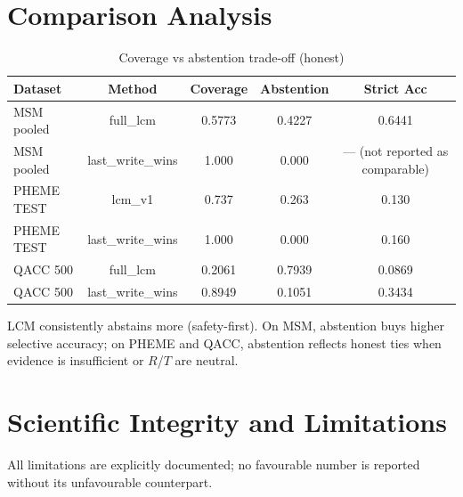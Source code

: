 \documentclass[12pt,a4paper]{article}
\begin{document}
\section{Comparison Analysis}

\begin{table}[H]
\centering\small
\caption{Coverage vs abstention trade-off (honest)}
\begin{tabular}{lcccc}
\toprule
Dataset & Method & Coverage & Abstention & Strict Acc \\
\midrule
MSM pooled & full\_lcm & 0.5773 & 0.4227 & 0.6441 \\
MSM pooled & last\_write\_wins & 1.000 & 0.000 & --- (not reported as comparable) \\
PHEME TEST & lcm\_v1 & 0.737 & 0.263 & 0.130 \\
PHEME TEST & last\_write\_wins & 1.000 & 0.000 & 0.160 \\
QACC 500 & full\_lcm & 0.2061 & 0.7939 & 0.0869 \\
QACC 500 & last\_write\_wins & 0.8949 & 0.1051 & 0.3434 \\
\bottomrule
\end{tabular}
\end{table}
LCM consistently abstains more (safety-first). On MSM, abstention buys higher selective accuracy; on PHEME and QACC, abstention reflects honest ties when evidence is insufficient or $R$/$T$ are neutral.

\section{Scientific Integrity and Limitations}
\label{sec:limitations}

All limitations are explicitly documented; no favourable number is reported without its unfavourable counterpart.
\end{document}
